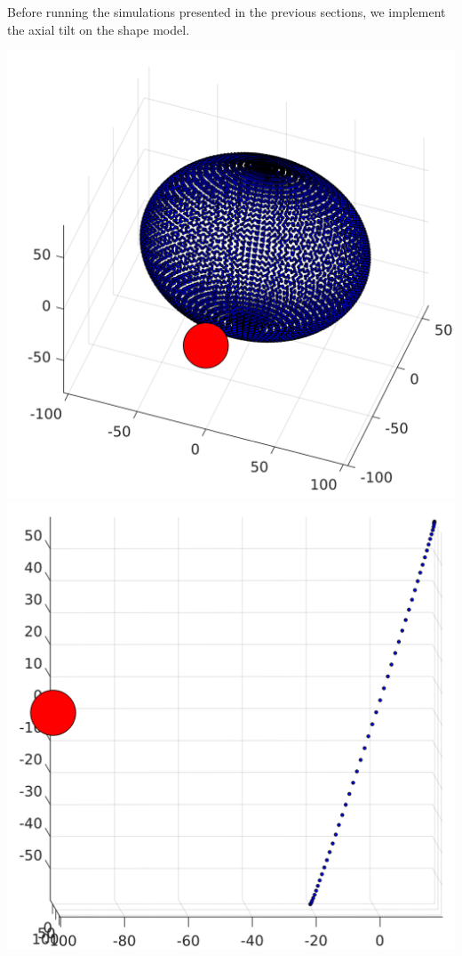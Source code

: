 Before running the simulations presented in the previous sections, we implement the axial tilt on the shape model.
\begin{center}
    \includegraphics[width=\linewidth]{rsc/obldemo1.png}
    \includegraphics[width=\linewidth]{rsc/obldemo2.png}

\end{center}
